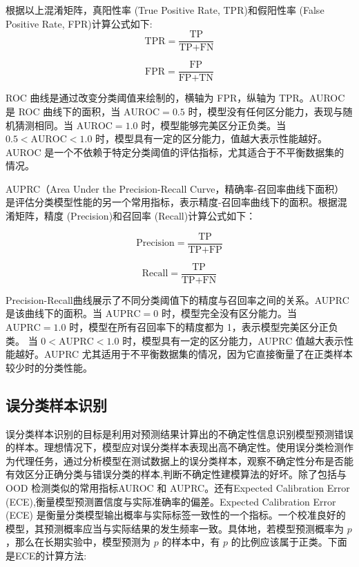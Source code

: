 根据以上混淆矩阵，真阳性率 (True Positive Rate, TPR)和假阳性率 (False Positive Rate, FPR)计算公式如下:
\[
\text{TPR} = \frac{\text{TP}}{\text{TP} + \text{FN}}
\]

\[
\text{FPR} = \frac{\text{FP}}{\text{FP} + \text{TN}}
\]

ROC 曲线是通过改变分类阈值来绘制的，横轴为 FPR，纵轴为 TPR。AUROC 是 ROC 曲线下的面积，当 \(\text{AUROC} = 0.5\) 时，模型没有任何区分能力，表现与随机猜测相同。当 \(\text{AUROC} = 1.0\) 时，模型能够完美区分正负类。当 \(0.5 < \text{AUROC} < 1.0\) 时，模型具有一定的区分能力，值越大表示性能越好。AUROC 是一个不依赖于特定分类阈值的评估指标，尤其适合于不平衡数据集的情况。

AUPRC（Area Under the Precision-Recall Curve，精确率-召回率曲线下面积）是评估分类模型性能的另一个常用指标，表示精度-召回率曲线下的面积。根据混淆矩阵，精度 (Precision)和召回率 (Recall)计算公式如下：

\[
\text{Precision} = \frac{\text{TP}}{\text{TP} + \text{FP}}
\]


\[
\text{Recall} = \frac{\text{TP}}{\text{TP} + \text{FN}}
\]



Precision-Recall曲线展示了不同分类阈值下的精度与召回率之间的关系。AUPRC 是该曲线下的面积。当 \(\text{AUPRC} = 0\) 时，模型完全没有区分能力。当 \(\text{AUPRC} = 1.0\) 时，模型在所有召回率下的精度都为 1，表示模型完美区分正负类。
当 \(0 < \text{AUPRC} < 1.0\) 时，模型具有一定的区分能力，AUPRC 值越大表示性能越好。AUPRC 尤其适用于不平衡数据集的情况，因为它直接衡量了在正类样本较少时的分类性能。




\subsection{误分类样本识别}


误分类样本识别的目标是利用对预测结果计算出的不确定性信息识别模型预测错误的样本。理想情况下，模型应对误分类样本表现出高不确定性。使用误分类检测作为代理任务，通过分析模型在测试数据上的误分类样本，观察不确定性分布是否能有效区分正确分类与错误分类的样本,判断不确定性建模算法的好坏。除了包括与OOD 检测类似的常用指标AUROC 和 AUPRC。还有Expected Calibration Error (ECE)\cite{guo2017calibration},衡量模型预测置信度与实际准确率的偏差。Expected Calibration Error (ECE) 是衡量分类模型输出概率与实际标签一致性的一个指标。一个校准良好的模型，其预测概率应当与实际结果的发生频率一致。具体地，若模型预测概率为 \( p \)，那么在长期实验中，模型预测为 \( p \) 的样本中，有 \( p \) 的比例应该属于正类。下面是ECE的计算方法:


